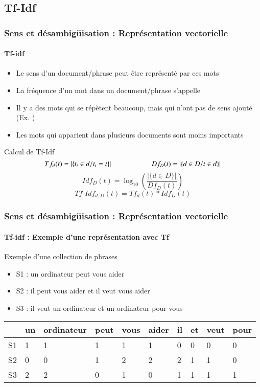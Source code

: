 \documentclass[xcolor=table]{beamer}
\begin{document}
\subsection{Tf-Idf}

\begin{frame}
\frametitle{Sens et désambigüisation : Représentation vectorielle}
\framesubtitle{Tf-idf}

\begin{itemize}
	\item Le sens d'un document/phrase peut être représenté par ces mots 
	\item La fréquence d'un mot dans un document/phrase s'appelle 
	\item Il y a des mots qui se répètent beaucoup, mais qui n'ont pas de sens ajouté (Ex. )
	\item Les mots qui apparient dans plusieurs documents sont moins importants
\end{itemize}

\begin{block}{Calcul de Tf-Idf}
	\[
	Tf_d(t) =  |\{t_i \in d / t_i = t\}|
	\hskip2cm 
	Df_D(t) = |\{d \in D / t \in d\}|
	\]
	\[Idf_D(t) = \log_{10} \left( \frac{|\{d \in D\}|}{Df_D(t)} \right)\]
	\[Tf\text{-}Idf_{d, D}(t) = Tf_d(t) * Idf_D(t)\]
\end{block}

\end{frame}


\begin{frame}
\frametitle{Sens et désambigüisation : Représentation vectorielle}
\framesubtitle{Tf-idf : Exemple d'une représentation avec Tf}

\begin{exampleblock}{Exemple d'une collection de phrases}
	\begin{itemize}
		\item S1 : un ordinateur peut vous aider
		\item S2 : il peut vous aider et il veut vous aider
		\item S3 : il veut un ordinateur et un ordinateur pour vous
	\end{itemize}
\end{exampleblock}

\begin{center}
	\begin{tabular}{llllllllll}
	\hline\hline
	& un & ordinateur & peut & vous & aider & il & et & veut & pour \\
	\hline
	S1 & 1 & 1 & 1 & 1 & 1 & 0 & 0 & 0 & 0\\
	S2 & 0 & 0 & 1 & 2 & 2 & 2 & 1 & 1 & 0\\
	S3 & 2 & 2 & 0 & 1 & 0 & 1 & 1 & 1 & 1\\
	\hline\hline
\end{tabular}
\end{center}

\end{frame}
\end{document}
